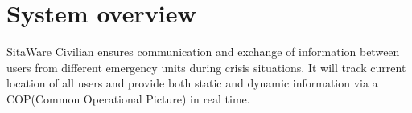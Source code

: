 \section{System overview}

SitaWare Civilian ensures communication and exchange of information between users from different emergency units during crisis situations. It will track current location of all users and provide both static and dynamic information via a COP(Common Operational Picture) in real time.